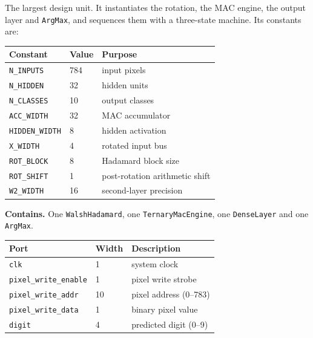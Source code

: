 \documentclass[11pt,a4paper]{article}
\begin{document}
The largest design unit. It instantiates the rotation, the MAC engine, the
output layer and \texttt{ArgMax}, and sequences them with a three-state machine.
Its constants are:

\begin{center}
\small
\begin{tabularx}{\linewidth}{@{}llL@{}}
\toprule
\textbf{Constant} & \textbf{Value} & \textbf{Purpose} \\
\midrule
\texttt{N\_INPUTS}    & 784 & input pixels \\
\texttt{N\_HIDDEN}    & 32  & hidden units \\
\texttt{N\_CLASSES}   & 10  & output classes \\
\texttt{ACC\_WIDTH}   & 32  & MAC accumulator \\
\texttt{HIDDEN\_WIDTH}& 8   & hidden activation \\
\texttt{X\_WIDTH}     & 4   & rotated input bus \\
\texttt{ROT\_BLOCK}   & 8   & Hadamard block size \\
\texttt{ROT\_SHIFT}   & 1   & post-rotation arithmetic shift \\
\texttt{W2\_WIDTH}    & 16  & second-layer precision \\
\bottomrule
\end{tabularx}
\end{center}

\textbf{Contains.} One \texttt{WalshHadamard}, one \texttt{TernaryMacEngine},
one \texttt{DenseLayer} and one \texttt{ArgMax}.

\begin{center}
\small
\begin{tabularx}{\linewidth}{@{}llL@{}}
\toprule
\textbf{Port} & \textbf{Width} & \textbf{Description} \\
\midrule
\texttt{clk}                  & 1  & system clock \\
\texttt{pixel\_write\_enable} & 1  & pixel write strobe \\
\texttt{pixel\_write\_addr}   & 10 & pixel address (0--783) \\
\texttt{pixel\_write\_data}   & 1  & binary pixel value \\
\texttt{digit}                & 4  & predicted digit (0--9) \\
\bottomrule
\end{tabularx}
\end{center}
\end{document}
